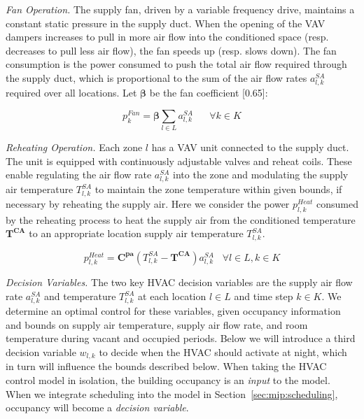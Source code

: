 \noindent\emph{Fan Operation.} The supply fan, driven by a variable frequency drive, maintains a constant static pressure in the supply
duct. When the opening of the VAV dampers increases to pull in more air flow into the conditioned space (resp. decreases to pull less air
flow), the fan speeds up (resp. slows down). The fan consumption is the power consumed to push the total air flow required through the
supply duct, which is proportional to the sum of the air flow rates $a^{SA}_{l,k}$ required over all locations. Let $\bm \beta$ be the fan
coefficient [0.65]: 

\begin{equation} \label{eq:p_fan}
p_{k}^{Fan} = \bm{\beta} \sum\limits_{l \in L} a_{l,k}^{SA} \hspace{20pt}  \forall k \in K
\end{equation}

\noindent\emph{Reheating Operation.} Each zone $l$ has a VAV unit connected to the supply duct. The unit is equipped with
continuously adjustable valves and reheat coils. These enable regulating the air flow rate $a^{SA}_{l,k}$ into the zone and
modulating the supply air temperature $T^{SA}_{l,k}$ to maintain the zone temperature within given bounds, if necessary by reheating the
supply air. Here we consider the power $p_{l,k}^{Heat}$ consumed by the reheating process to heat the supply air from the conditioned
temperature $\bm{T^{CA}}$ to an appropriate location supply air temperature $T_{l,k}^{SA}$.  

\begin{equation} \label{eq:p_heat} 
p_{l,k}^{Heat} = \bm{C^{pa}} (T_{l,k}^{SA}- \bm{T^{CA}}) a_{l,k}^{SA} \hspace{10pt} \forall l \in L,k \in K 
\end{equation}

\noindent\emph{Decision Variables.} The two key HVAC decision variables are the supply air flow rate $a_{l,k}^{SA}$ and
temperature $T_{l,k}^{SA}$ at each location $l \in L$ and time step $k\in K$. We determine an optimal control for these variables, given
occupancy information and bounds on supply air temperature, supply air flow rate, and room temperature during vacant and occupied
periods. Below we will introduce a third decision variable $w_{l,k}$ to decide when the HVAC should activate at night, which in turn will influence the bounds described below. When taking the HVAC control model in isolation, the building occupancy is an {\em input} to the model. When we integrate scheduling into the model in Section~\ref{sec:mip:scheduling}, occupancy will become a {\em decision variable}.

